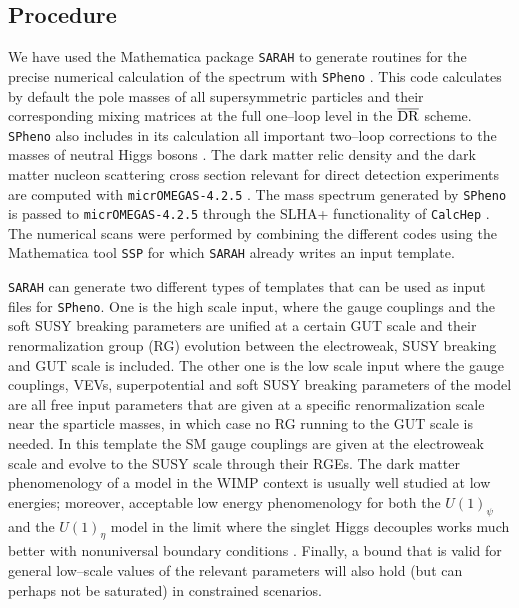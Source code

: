 \documentclass[a4paper,11pt]{article}
\begin{document}
\subsection{Procedure}
\label{subsection4.1}

We have used the Mathematica package {\tt SARAH} \cite{Staub:2008uz,
  Staub:2013tta, Staub:2015kfa} to generate routines for the precise
numerical calculation of the spectrum with {\tt SPheno}
\cite{Porod:2003um, Porod:2011nf}. This code calculates by default the
pole masses of all supersymmetric particles and their corresponding
mixing matrices at the full one--loop level in the
$\overline{{\rm DR}}$ scheme. {\tt SPheno} also includes in its
calculation all important two--loop corrections to the masses of
neutral Higgs bosons \cite{Goodsell:2014bna, Goodsell:2015ira,
  Braathen:2017izn}.  The dark matter relic density and the dark
matter nucleon scattering cross section relevant for direct detection
experiments are computed with {\tt micrOMEGAS-4.2.5}
\cite{Belanger:2014vza}. The mass spectrum generated by {\tt SPheno}
is passed to {\tt micrOMEGAS-4.2.5} through the SLHA+ functionality
\cite{Belanger:2010st} of {\tt CalcHep} \cite{Pukhov:2004ca,
  Belyaev:2012qa}. The numerical scans were performed by combining the
different codes using the Mathematica tool {\tt SSP}
\cite{Staub:2011dp} for which {\tt SARAH} already writes an input
template.

{\tt SARAH} can generate two different types of templates that can be
used as input files for {\tt SPheno}. One is the high scale input,
where the gauge couplings and the soft SUSY breaking parameters are
unified at a certain GUT scale and their renormalization group (RG)
evolution between the electroweak, SUSY breaking and GUT scale is
included. The other one is the low scale input where the gauge
couplings, VEVs, superpotential and soft SUSY breaking parameters of
the model are all free input parameters that are given at a specific
renormalization scale near the sparticle masses, in which case no RG
running to the GUT scale is needed. In this template the SM gauge
couplings are given at the electroweak scale and evolve to the SUSY
scale through their RGEs. The dark matter phenomenology of a model in
the WIMP context is usually well studied at low energies; moreover,
acceptable low energy phenomenology for both the $U(1)_{\psi}$ and the
$U(1)_{\eta}$ model in the limit where the singlet Higgs decouples
works much better with nonuniversal boundary conditions
\cite{Langacker:1998tc}. Finally, a bound that is valid for general
low--scale values of the relevant parameters will also hold (but can
perhaps not be saturated) in constrained scenarios.
\end{document}
